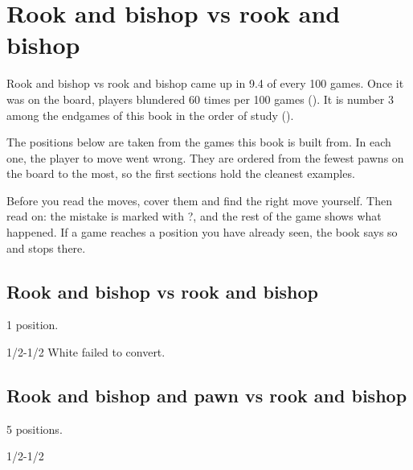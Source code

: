 \chapter{Rook and bishop vs rook and bishop}\label{ch:rook-and-bishop-vs-rook-and-bishop}
Rook and bishop vs rook and bishop came up in 9.4 of every 100 games. Once it was on the board, players blundered 60 times per 100 games (). It is number 3 among the endgames of this book in the order of study ().

The positions below are taken from the games this book is built from. In each one, the player to move went wrong. They are ordered from the fewest pawns on the board to the most, so the first sections hold the cleanest examples.

Before you read the moves, cover them and find the right move yourself. Then read on: the mistake is marked with ?, and the rest of the game shows what happened. If a game reaches a position you have already seen, the book says so and stops there.


\section{Rook and bishop vs rook and bishop}
1 position.


1/2-1/2 White failed to convert.\par
\section{Rook and bishop and pawn vs rook and bishop}
5 positions.


1/2-1/2\par
{}

